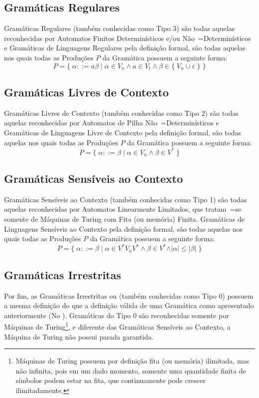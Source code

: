 {\subsection{Gramáticas Regulares}

    Gramáticas Regulares (também conhecidas como Tipo 3) são todas aquelas reconhecidas por Automatos Finitos Determinísticos e\slash{}ou Não~=Determinísticos e
    Gramáticas de Linguagens Regulares pela definição formal,
    são todas aquelas nos quais todas as Produções $P$ da Gramática possuem a seguinte forma:
    $$ P = \{\; \alpha ::= a \beta \;|\; \alpha \in V_n \land a \in V_t
                \land \beta \in \{\; V_n \cup \varepsilon\; \} \;\} $$

\subsection{Gramáticas Livres de Contexto}

    Gramáticas Livres de Contexto (também conhecidas como Tipo 2) \cite{hopcroftBook} são todas aquelas reconhecidas por Automatos de Pilha Não~=Determinísticos e
    Gramáticas de Linguagens Livre de Contexto pela definição formal,
    são todas aquelas nos quais todas as Produções $P$ da Gramática possuem a seguinte forma:
    $$ P = \{\; \alpha ::= \beta \;|\; \alpha \in V_n \land \beta \in V^* \;\} $$


\subsection{Gramáticas Sensíveis ao Contexto}

    Gramáticas Sensíveis ao Contexto (também conhecidas como Tipo 1) são todas aquelas reconhecidas por Automatos Linearmente Limitados,
    que tratam~=se somente de Máquinas de Turing \cite{sipserBook} com Fita (ou memória) Finita.
    Gramáticas de Linguagens Sensíveis ao Contexto pela definição formal,
    são todas aquelas nos quais todas as Produções $P$ da Gramática possuem a seguinte forma:
    $$ P = \{\; \alpha ::= \beta \;|\; \alpha \in V^* V_n V^* \land \beta \in V^*
                \land \vert\alpha\vert \leq \vert\beta\vert \;\} $$


\subsection{Gramáticas Irrestritas}

    Por fim,
    as Gramáticas Irrestritas ou (também conhecidas como Tipo 0) possuem a mesma definição do
    que a definição válida de uma Gramática como apresentado anteriormente (No
    ).
    Gramáticas do Tipo 0 são reconhecidas somente por Máquinas de Turing\footnote{Máquinas de Turing possuem por definição fita (ou memória) ilimitada,
    mas não infinita,
    pois em um dado momento,
    somente uma quantidade finita de símbolos podem estar na fita,
    que continuamente pode crescer ilimitadamente.
    },
    e diferente das Gramáticas Sensíveis ao Contexto,
    a Máquina de Turing não possui parada garantida.

}
